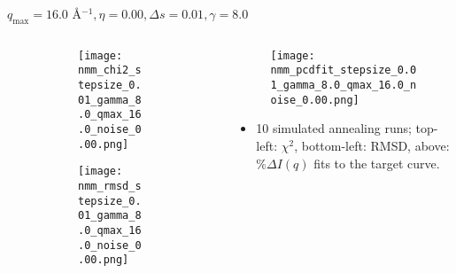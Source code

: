 \documentclass{beamer}
\begin{document}
\begin{frame}{$ q_{\textrm{max}}=16.0 $ \AA $^{-1}, \eta=0.00, \Delta s=0.01, \gamma=8.0$}
	\begin{columns}
		\begin{column}{.5\textwidth}
			\begin{figure}[H]
			\centering
			\begin{subfigure}[b]{\textwidth}
				\centering
				\texttt{[image: nmm\_chi2\_stepsize\_0.01\_gamma\_8.0\_qmax\_16.0\_noise\_0.00.png]}
				\label{fig:}
			\end{subfigure}
			\begin{subfigure}[b]{\textwidth}
				\centering
				\texttt{[image: nmm\_rmsd\_stepsize\_0.01\_gamma\_8.0\_qmax\_16.0\_noise\_0.00.png]}
				\label{fig:}
			\end{subfigure}
			\end{figure}
		\end{column}
		\begin{column}{.5\textwidth}
			\begin{figure}[H]
				\centering
				\texttt{[image: nmm\_pcdfit\_stepsize\_0.01\_gamma\_8.0\_qmax\_16.0\_noise\_0.00.png]}
				\label{fig:}
			\end{figure}
			\begin{itemize}
				\item 10 simulated annealing runs; top-left: $\chi^2$, bottom-left: RMSD, above: $\%\Delta I(q)$ fits to the target curve.
			\end{itemize}
		\end{column}
	\end{columns}
\end{frame}
 
\end{document}
